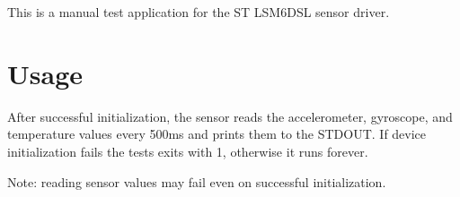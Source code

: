 This is a manual test application for the ST L\+S\+M6\+D\+SL sensor driver.

\section*{Usage}

After successful initialization, the sensor reads the accelerometer, gyroscope, and temperature values every 500ms and prints them to the S\+T\+D\+O\+UT. If device initialization fails the tests exits with 1, otherwise it runs forever.

Note\+: reading sensor values may fail even on successful initialization. 